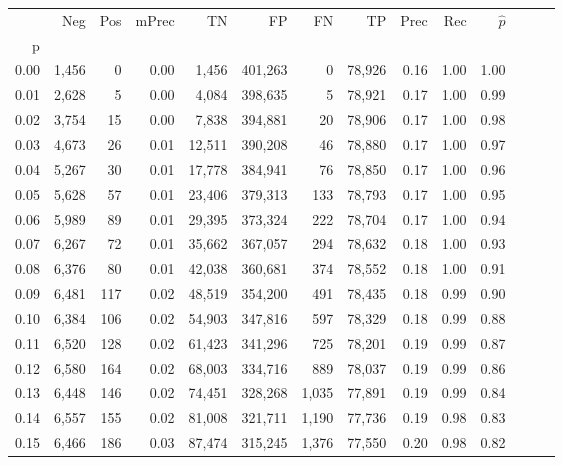 \begin{tabular}{rrrrrrrrrrrrrr}
\toprule
{} &    Neg &    Pos & mPrec &       TN &       FP &      FN &      TP &  Prec &   Rec & $\hat{p}$ \\
p    &        &        &       &          &          &         &         &       &       &           \\
\midrule
0.00 &  1,456 &      0 &  0.00 &    1,456 &  401,263 &       0 &  78,926 &  0.16 &  1.00 &      1.00 \\
0.01 &  2,628 &      5 &  0.00 &    4,084 &  398,635 &       5 &  78,921 &  0.17 &  1.00 &      0.99 \\
0.02 &  3,754 &     15 &  0.00 &    7,838 &  394,881 &      20 &  78,906 &  0.17 &  1.00 &      0.98 \\
0.03 &  4,673 &     26 &  0.01 &   12,511 &  390,208 &      46 &  78,880 &  0.17 &  1.00 &      0.97 \\
0.04 &  5,267 &     30 &  0.01 &   17,778 &  384,941 &      76 &  78,850 &  0.17 &  1.00 &      0.96 \\
0.05 &  5,628 &     57 &  0.01 &   23,406 &  379,313 &     133 &  78,793 &  0.17 &  1.00 &      0.95 \\
0.06 &  5,989 &     89 &  0.01 &   29,395 &  373,324 &     222 &  78,704 &  0.17 &  1.00 &      0.94 \\
0.07 &  6,267 &     72 &  0.01 &   35,662 &  367,057 &     294 &  78,632 &  0.18 &  1.00 &      0.93 \\
0.08 &  6,376 &     80 &  0.01 &   42,038 &  360,681 &     374 &  78,552 &  0.18 &  1.00 &      0.91 \\
0.09 &  6,481 &    117 &  0.02 &   48,519 &  354,200 &     491 &  78,435 &  0.18 &  0.99 &      0.90 \\
0.10 &  6,384 &    106 &  0.02 &   54,903 &  347,816 &     597 &  78,329 &  0.18 &  0.99 &      0.88 \\
0.11 &  6,520 &    128 &  0.02 &   61,423 &  341,296 &     725 &  78,201 &  0.19 &  0.99 &      0.87 \\
0.12 &  6,580 &    164 &  0.02 &   68,003 &  334,716 &     889 &  78,037 &  0.19 &  0.99 &      0.86 \\
0.13 &  6,448 &    146 &  0.02 &   74,451 &  328,268 &   1,035 &  77,891 &  0.19 &  0.99 &      0.84 \\
0.14 &  6,557 &    155 &  0.02 &   81,008 &  321,711 &   1,190 &  77,736 &  0.19 &  0.98 &      0.83 \\
0.15 &  6,466 &    186 &  0.03 &   87,474 &  315,245 &   1,376 &  77,550 &  0.20 &  0.98 &      0.82 \\

\end{tabular}
